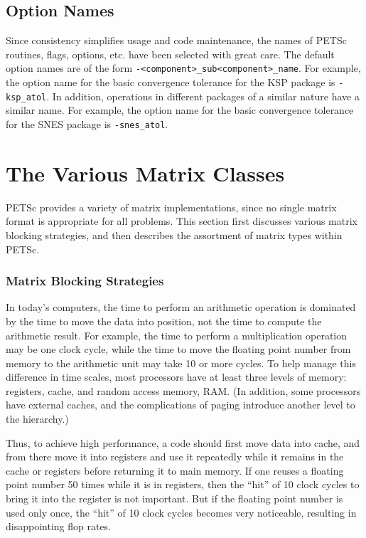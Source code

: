 \section{Option Names}

Since consistency simplifies usage and code maintenance, the names of
PETSc routines, flags, options, etc. have been selected with great care.
The default option names are of the form {\tt -<component>\_sub<component>\_name}.  
For example, the option name for the basic convergence tolerance for 
the KSP package is {\tt -ksp\_atol}. In addition, operations in different 
packages of a similar nature have a similar name.  For example, the option
name for the basic convergence tolerance for the SNES package is 
{\tt -snes\_atol}.

\chapter{The Various Matrix Classes}
\label{sec:matclasses}

PETSc provides a variety of matrix implementations, since no single
matrix format is appropriate for all problems.  This section first
discusses various matrix blocking strategies, and then 
describes the assortment of matrix types within PETSc.

\subsection{Matrix Blocking Strategies}

In today's computers, the time to perform an arithmetic operation is
dominated by the time to move the data into position, not the time to
compute the arithmetic result.  For example, the time to perform a
multiplication operation may be one clock cycle, while the time to
move the floating point number from memory to the arithmetic unit may
take 10 or more cycles. To help manage this difference in time scales,
most processors have at least three levels of memory: registers,
cache, and random access memory, RAM. (In addition, some processors
have external caches, and the complications of paging introduce
another level to the hierarchy.)

Thus, to achieve high performance, a code should first move data into
cache, and from there move it into registers and use it repeatedly
while it remains in the cache or registers before returning it to main
memory. If one reuses a floating point number 50 times while it is in
registers, then the ``hit'' of 10 clock cycles to bring it into the
register is not important. But if the floating point number is used
only once, the ``hit'' of 10 clock cycles becomes very noticeable,
resulting in disappointing flop rates.

